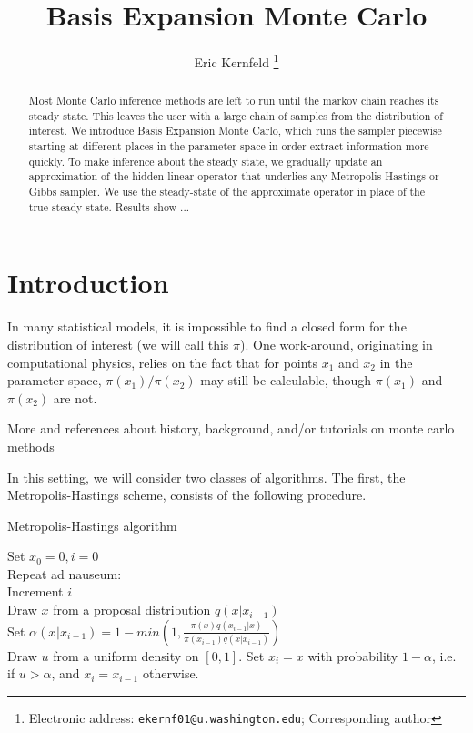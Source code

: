 \documentclass{article}
\begin{document}
\title{Basis Expansion Monte Carlo}

\author{Eric Kernfeld
  \thanks{Electronic address: \texttt{ekernf01@u.washington.edu}; Corresponding author}}
\maketitle

\begin{abstract}
Most Monte Carlo inference methods are left to run until the markov chain reaches its steady state. This leaves the user with a large chain of samples from the distribution of interest. We introduce Basis Expansion Monte Carlo, which runs the sampler piecewise starting at different places in the parameter space in order extract information more quickly. To make inference about the steady state, we gradually update an approximation of the hidden linear operator that underlies any Metropolis-Hastings or Gibbs sampler. We use the steady-state of the approximate operator in place of the true steady-state. Results show ...
\end{abstract}


\section{Introduction}
In many statistical models, it is impossible to find a closed form for the distribution of interest (we will call this $\pi$). One work-around, originating in computational physics, relies on the fact that for points $x_1$ and $x_2$ in the parameter space, $\pi(x_1)/\pi(x_2)$ may still be calculable, though $\pi(x_1)$ and $\pi(x_2)$ are not.

More and references about history, background, and/or tutorials on monte carlo methods

In this setting, we will consider two classes of algorithms. The first, the Metropolis-Hastings scheme, consists of the following procedure.

\begin{algorithm}[h]
\caption{Metropolis-Hastings algorithm}
Set $x_0 = 0, i=0$\\
Repeat ad nauseum:\\
\Indp
Increment $i$\\
Draw $x$ from a proposal distribution $q(x|x_{i-1})$\\
Set $\alpha(x_{}|x_{i-1}) = 1 - min(1, \frac{\pi(x)q(x_{i-1}|x)}{\pi(x_{i-1})q(x|x_{i-1})})$\\
Draw $u$ from a uniform density on $[0,1]$.
Set $x_i = x$ with probability $1 - \alpha$, i.e. if $u >\alpha$, and $x_i = x_{i-1}$ otherwise.\\
\end{algorithm}
\end{document}
